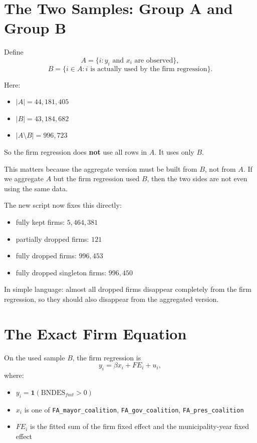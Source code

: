 \documentclass[11pt]{article}
\begin{document}
\section{The Two Samples: Group A and Group B}

Define
\[
A = \{i: y_i \text{ and } x_i \text{ are observed}\},
\]
\[
B = \{i \in A: i \text{ is actually used by the firm regression}\}.
\]

Here:
\begin{itemize}
  \item $|A| = 44{,}181{,}405$
  \item $|B| = 43{,}184{,}682$
  \item $|A \setminus B| = 996{,}723$
\end{itemize}

So the firm regression does \textbf{not} use all rows in $A$. It uses only $B$.

This matters because the aggregate version must be built from $B$, not from $A$. If we aggregate $A$ but the firm regression used $B$, then the two sides are not even using the same data.

The new script now fixes this directly:
\begin{itemize}
  \item fully kept firms: $5{,}464{,}381$
  \item partially dropped firms: $121$
  \item fully dropped firms: $996{,}453$
  \item fully dropped singleton firms: $996{,}450$
\end{itemize}

In simple language: almost all dropped firms disappear completely from the firm regression, so they should also disappear from the aggregated version.

\section{The Exact Firm Equation}

On the used sample $B$, the firm regression is
\[
y_i = \beta x_i + FE_i + u_i,
\]
where:
\begin{itemize}
  \item $y_i = \mathbf{1}(\mathrm{BNDES}_{fmt} > 0)$
  \item $x_i$ is one of \texttt{FA\_mayor\_coalition}, \texttt{FA\_gov\_coalition}, \texttt{FA\_pres\_coalition}
  \item $FE_i$ is the fitted sum of the firm fixed effect and the municipality-year fixed effect
\end{itemize}
\end{document}
